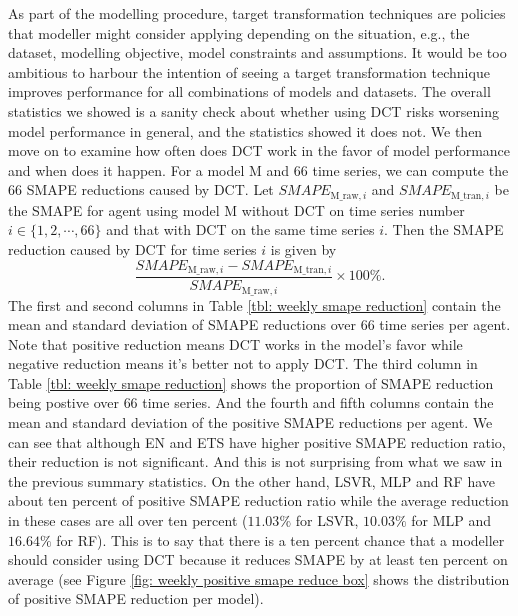 As part of the modelling procedure, target transformation techniques are policies that modeller might consider applying depending on the situation, e.g., the dataset, modelling objective, model constraints and assumptions. It would be too ambitious to harbour the intention of seeing a target transformation technique improves performance for all combinations of models and datasets. The overall statistics we showed is a sanity check about whether using DCT risks worsening model performance in general, and the statistics showed it does not. We then move on to examine how often does DCT work in the favor of model performance and when does it happen. For a model M and $66$ time series, we can compute the $66$ SMAPE reductions caused by DCT. Let $SMAPE_{\text{M\_raw}, i}$ and $SMAPE_{\text{M\_tran}, i}$ be the SMAPE for agent using model M without DCT on time series number $i \in \{1, 2, \cdots, 66\}$ and that with DCT on the same time series $i$. Then the SMAPE reduction caused by DCT for time series $i$ is given by
\begin{equation*}
    \frac{SMAPE_{\text{M\_raw}, i} - SMAPE_{\text{M\_tran}, i}}{SMAPE_{\text{M\_raw}, i}} \times 100 \%.
\end{equation*}
The first and second columns in Table \ref{tbl: weekly smape reduction} contain the mean and standard deviation of SMAPE reductions over $66$ time series per agent. Note that positive reduction means DCT works in the model's favor while negative reduction means it's better not to apply DCT. The third column in Table \ref{tbl: weekly smape reduction} shows the proportion of SMAPE reduction being postive over $66$ time series. And the fourth and fifth columns contain the mean and standard deviation of the positive SMAPE reductions per agent. We can see that although EN and ETS have higher positive SMAPE reduction ratio, their reduction is not significant. And this is not surprising from what we saw in the previous summary statistics. On the other hand, LSVR, MLP and RF have about ten percent of positive SMAPE reduction ratio while the average reduction in these cases are all over ten percent ($11.03\%$ for LSVR, $10.03\%$ for MLP and $16.64\%$ for RF). This is to say that there is a ten percent chance that a modeller should consider using DCT because it reduces SMAPE by at least ten percent on average (see Figure \ref{fig: weekly positive smape reduce box} shows the distribution of positive SMAPE reduction per model).
